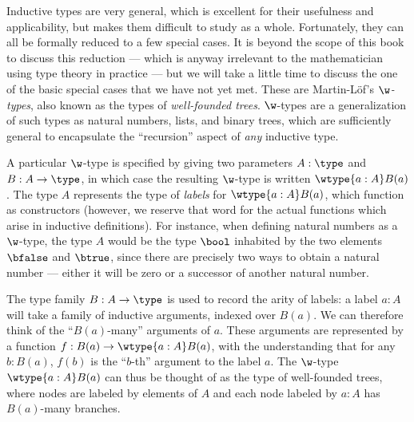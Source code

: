 Inductive types are very general, which is excellent for their usefulness and applicability, but makes them difficult to study as a whole.
Fortunately, they can all be formally reduced to a few special cases.
It is beyond the scope of this book to discuss this reduction --- which is anyway irrelevant to the mathematician using type theory in practice --- but we will take a little time to discuss the one of the basic special cases that we have not yet met.
These are Martin-L{\"o}f's \emph{$\w$-types}, also known as the types of \emph{well-founded trees}.
%
$\w$-types are a generalization of such types as natural numbers, lists, and binary trees, which are sufficiently general to encapsulate the ``recursion'' aspect of \emph{any} inductive type.

A particular $\w$-type is specified by giving two parameters $A : \type$ and $B : A \to \type$, in which case the resulting $\w$-type is written $\wtype{a:A} B(a)$.
The type $A$ represents the type of \emph{labels} for $\wtype{a :A} B(a)$, which function as constructors (however, we reserve that word for the actual functions which arise in inductive definitions). For instance, when defining natural numbers as a $\w$-type,%
the type $A$ would be the type $\bool$ inhabited by the two elements $\bfalse$ and $\btrue$, since there are precisely two ways to obtain a natural number --- either it will be zero or a successor of another natural number.

The type family $B : A \to \type$ is used to record the arity of labels: a label $a : A$ will take a family of inductive arguments, indexed over $B(a)$. We can therefore think of the ``$B(a)$-many'' arguments of $a$. These arguments are represented by a function $f : B(a) \to \wtype{a :A} B(a)$, with the understanding that for any $b : B(a)$, $f(b)$ is the ``$b$-th'' argument to the label $a$. The $\w$-type $\wtype{a :A} B(a)$ can thus be thought of as the type of well-founded trees, where nodes are labeled by elements of $A$ and each node labeled by $a : A$ has $B(a)$-many branches.

